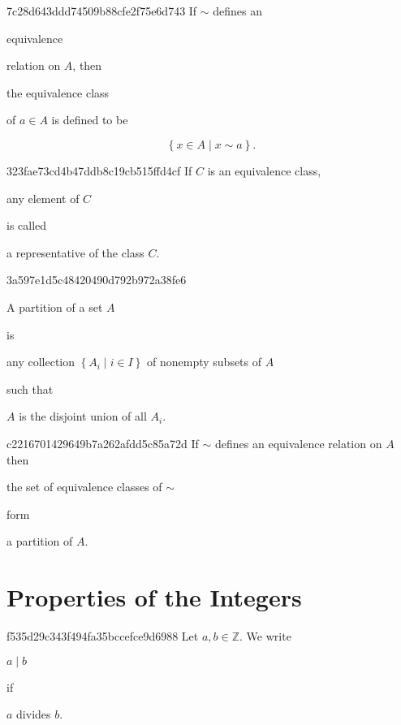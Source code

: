 \begin{note}{7c28d643ddd74509b88cfe2f75e6d743}
    If \({ \sim }\) defines an \begin{icloze}{3}equivalence\end{icloze} relation on \({ A }\), then \begin{icloze}{2}the equivalence class\end{icloze} of \({ a \in A }\) is defined to be
    \begin{icloze}{1}
        \[
            \left\{ x \in A \mid x \sim a \right\}.
        \]
    \end{icloze}
\end{note}

\begin{note}{323fae73cd4b47ddb8c19cb515ffd4cf}
    If \({ C }\) is an equivalence class, \begin{icloze}{2}any element of \({ C }\)\end{icloze} is called \begin{icloze}{1}a representative of the class \({ C }\).\end{icloze}
\end{note}

\begin{note}{3a597e1d5c48420490d792b972a38fe6}
    \begin{icloze}{2}A partition of a set \({ A }\)\end{icloze} is \begin{icloze}{3}any collection \({ \left\{ A_i \mid i \in I \right\} }\) of nonempty subsets of \({ A }\)\end{icloze} such that \begin{icloze}{1}\({ A }\) is the disjoint union of all \({ A_i }\).\end{icloze}
\end{note}

\begin{note}{c2216701429649b7a262afdd5c85a72d}
    If \({ \sim }\) defines an equivalence relation on \({ A }\) then \begin{icloze}{2}the set of equivalence classes of \({ \sim }\)\end{icloze} form \begin{icloze}{1}a partition of \({ A }\).\end{icloze}
\end{note}

\section{Properties of the Integers}
\begin{note}{f535d29c343f494fa35bccefce9d6988}
    Let \({ a, b \in \mathbb Z }\).
    We write \begin{icloze}{2}\({ a \mid b }\)\end{icloze} if \begin{icloze}{1}\({ a }\) divides \({ b }\).\end{icloze}
\end{note}

